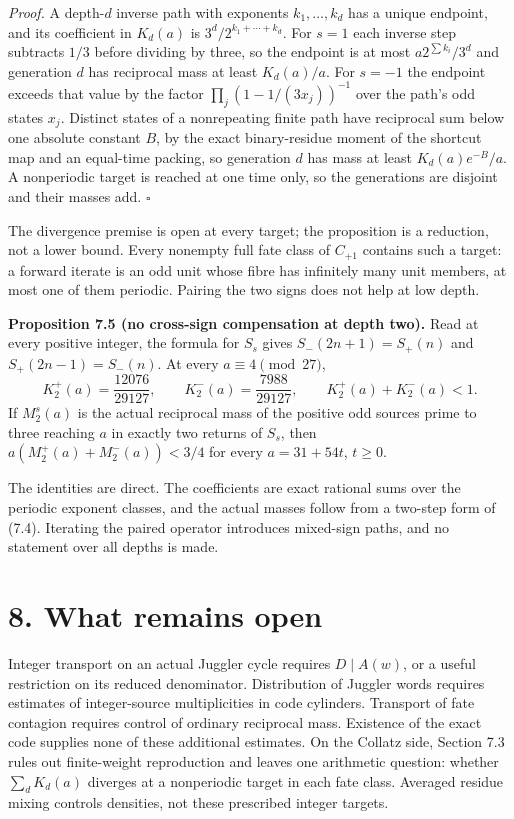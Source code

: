 \documentclass[11pt,a4paper]{article}
\begin{document}
\emph{Proof.} A depth-\(d\) inverse path with exponents
\(k_1,\ldots,k_d\) has a unique endpoint, and its coefficient in
\(K_d(a)\) is \(3^d/2^{k_1+\cdots+k_d}\). For \(s=1\) each inverse step
subtracts \(1/3\) before dividing by three, so the endpoint is at most
\(a2^{\sum k_i}/3^d\) and generation \(d\) has reciprocal mass at least
\(K_d(a)/a\). For \(s=-1\) the endpoint exceeds that value by the factor
\(\prod_j(1-1/(3x_j))^{-1}\) over the path's odd states \(x_j\).
Distinct states of a nonrepeating finite path have reciprocal sum below
one absolute constant \(B\), by the exact binary-residue moment of the
shortcut map and an equal-time packing, so generation \(d\) has mass at
least \(K_d(a)e^{-B}/a\). A nonperiodic target is reached at one time
only, so the generations are disjoint and their masses add. \(\square\)

The divergence premise is open at every target; the proposition is a
reduction, not a lower bound. Every nonempty full fate class of
\(C_{+1}\) contains such a target: a forward iterate is an odd unit
whose fibre has infinitely many unit members, at most one of them
periodic. Pairing the two signs does not help at low depth.

\textbf{Proposition 7.5 (no cross-sign compensation at depth two).} Read
at every positive integer, the formula for \(S_s\) gives
\(S_-(2n+1)=S_+(n)\) and \(S_+(2n-1)=S_-(n)\). At every
\(a\equiv4\pmod{27}\), \[
K_2^+(a)=\frac{12076}{29127},\qquad K_2^-(a)=\frac{7988}{29127},\qquad
K_2^+(a)+K_2^-(a)<1 .
\] If \(M_2^s(a)\) is the actual reciprocal mass of the positive odd
sources prime to three reaching \(a\) in exactly two returns of \(S_s\),
then \(a(M_2^+(a)+M_2^-(a))<3/4\) for every \(a=31+54t\), \(t\ge0\).

The identities are direct. The coefficients are exact rational sums over
the periodic exponent classes, and the actual masses follow from a
two-step form of (7.4). Iterating the paired operator introduces
mixed-sign paths, and no statement over all depths is made.

\section{8. What remains open}\label{what-remains-open}

Integer transport on an actual Juggler cycle requires \(D\mid A(w)\), or
a useful restriction on its reduced denominator. Distribution of Juggler
words requires estimates of integer-source multiplicities in code
cylinders. Transport of fate contagion requires control of ordinary
reciprocal mass. Existence of the exact code supplies none of these
additional estimates. On the Collatz side, Section 7.3 rules out
finite-weight reproduction and leaves one arithmetic question: whether
\(\sum_dK_d(a)\) diverges at a nonperiodic target in each fate class.
Averaged residue mixing controls densities, not these prescribed integer
targets.
\end{document}

